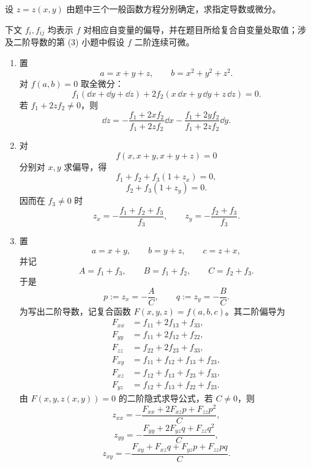 \begin{xexercise}[20.1.4 练习题 4]
设 $z=z(x,y)$ 由题中三个一般函数方程分别确定，求指定导数或微分。
\end{xexercise}
\begin{xsolution}
下文 $f_i,f_{ij}$ 均表示 $f$ 对相应自变量的偏导，并在题目所给复合自变量处取值；涉及二阶导数的第 (3) 小题中假设 $f$ 二阶连续可微。

\begin{enumerate}[label=(\arabic*)]
  \item 置
  \[
    a=x+y+z,\qquad b=x^2+y^2+z^2.
  \]
  对 $f(a,b)=0$ 取全微分：
  \[
    f_1(\dd x+\dd y+\dd z)
    +2f_2(x\,\dd x+y\,\dd y+z\,\dd z)=0.
  \]
  若 $f_1+2zf_2\ne0$，则
  \[
    \boxed{\displaystyle
    \dd z=-\frac{f_1+2xf_2}{f_1+2zf_2}\dd x
           -\frac{f_1+2yf_2}{f_1+2zf_2}\dd y}.
  \]

  \item 对
  \[
    f(x,x+y,x+y+z)=0
  \]
  分别对 $x,y$ 求偏导，得
  \[
    f_1+f_2+f_3(1+z_x)=0,
  \]
  \[
    f_2+f_3(1+z_y)=0.
  \]
  因而在 $f_3\ne0$ 时
  \[
    \boxed{\displaystyle
      z_x=-\frac{f_1+f_2+f_3}{f_3},\qquad
      z_y=-\frac{f_2+f_3}{f_3}}.
  \]

  \item 置
  \[
    a=x+y,\qquad b=y+z,\qquad c=z+x,
  \]
  并记
  \[
    A=f_1+f_3,\qquad B=f_1+f_2,\qquad C=f_2+f_3.
  \]
  于是
  \[
    p:=z_x=-\frac AC,
    \qquad
    q:=z_y=-\frac BC.
  \]
  为写出二阶导数，记复合函数 $F(x,y,z)=f(a,b,c)$。其二阶偏导为
  \begin{align*}
    F_{xx}&=f_{11}+2f_{13}+f_{33},\\
    F_{yy}&=f_{11}+2f_{12}+f_{22},\\
    F_{zz}&=f_{22}+2f_{23}+f_{33},\\
    F_{xy}&=f_{11}+f_{12}+f_{13}+f_{23},\\
    F_{xz}&=f_{12}+f_{13}+f_{23}+f_{33},\\
    F_{yz}&=f_{12}+f_{13}+f_{22}+f_{23}.
  \end{align*}
  由 $F(x,y,z(x,y))=0$ 的二阶隐式求导公式，若 $C\ne0$，则
  \[
    \boxed{\displaystyle
      z_{xx}=-\frac{F_{xx}+2F_{xz}p+F_{zz}p^2}{C}},
  \]
  \[
    \boxed{\displaystyle
      z_{yy}=-\frac{F_{yy}+2F_{yz}q+F_{zz}q^2}{C}},
  \]
  \[
    \boxed{\displaystyle
      z_{xy}=-\frac{F_{xy}+F_{xz}q+F_{yz}p+F_{zz}pq}{C}}.
  \]
\end{enumerate}
\end{xsolution}

